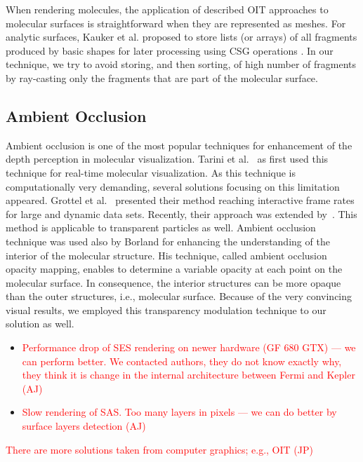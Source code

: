 When rendering molecules, the application of described OIT approaches to molecular surfaces is straightforward when they are represented as meshes.
For analytic surfaces, Kauker et al. proposed to store lists (or arrays) of all fragments produced by basic shapes for later processing using CSG operations \cite{kauker2013rendering}.
In our technique, we try to avoid storing, and then sorting, of high number of fragments by ray-casting only the fragments that are part of the molecular surface.


\subsection{Ambient Occlusion}
Ambient occlusion is one of the most popular techniques for enhancement of the depth perception in molecular visualization.
Tarini et al.~\cite{tarini2006ambient} as first used this technique for real-time molecular visualization.
As this technique is computationally very demanding, several solutions focusing on this limitation appeared.
Grottel et al.~\cite{grottel2012object} presented their method reaching interactive frame rates for large and dynamic data sets. 
Recently, their approach was extended by~\cite{staib2015ambient}.
This method is applicable to transparent particles as well.
Ambient occlusion technique was used also by Borland\cite{borland2011ambient} for enhancing the understanding of the interior of the molecular structure.
His technique, called ambient occlusion opacity mapping, enables to determine a variable opacity at each point on the molecular surface.
In consequence, the interior structures can be more opaque than the outer structures, i.e., molecular surface.
Because of the very convincing visual results, we employed this transparency modulation technique to our solution as well.


\begin{itemize}
  \item \textcolor{red}{Performance drop of SES rendering on newer hardware (GF 680 GTX) --- we can perform better. We contacted authors, they do not know exactly why, they think it is change in the internal architecture between Fermi and Kepler (AJ)}
  \item \textcolor{red}{Slow rendering of SAS. Too many layers in pixels --- we can do better by surface layers detection (AJ)}
\end{itemize}

\textcolor{red}{There are more solutions taken from computer graphics; e.g., OIT (JP)}



